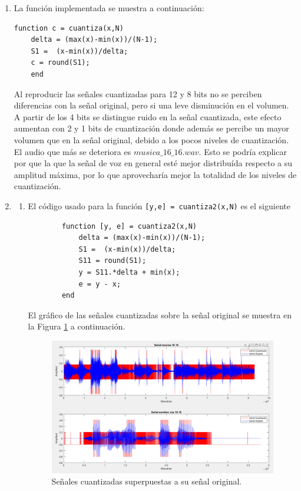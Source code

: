 \documentclass[letterpaper,onecolumn,10pt,journal,final]{IEEEtran}
\begin{document}
\begin{enumerate}[{1)}]
    \item La función implementada se muestra a continuación:
    
    \begin{lstlisting}[frame=single]
    function c = cuantiza(x,N)
    delta = (max(x)-min(x))/(N-1);
    S1 =  (x-min(x))/delta;
    c = round(S1);
    end
    \end{lstlisting}
    
    Al reproducir las señales cuantizadas para 12 y 8 bits no se perciben diferencias con la señal original, pero si una leve disminución en el volumen. A partir de los 4 bits se distingue ruido en la señal cuantizada, este efecto aumentan con 2 y 1 bits de cuantización donde además se percibe un mayor volumen que en la señal original, debido a los pocos niveles de cuantización.\\

    El audio que más se deteriora es $musica\_16\_16.wav$. Esto se podría explicar por que la que la señal de voz en general esté mejor distribuída respecto a su amplitud máxima, por lo que aprovecharía mejor la totalidad de los niveles de cuantización.

    
    
    \item
    \begin{enumerate}[{a)}]
        \item 
        
        El código usado para la función \texttt{[y,e] = cuantiza2(x,N)} es el siguiente
        \begin{lstlisting}
        function [y, e] = cuantiza2(x,N)
            delta = (max(x)-min(x))/(N-1);
            S1 =  (x-min(x))/delta;
            S11 = round(S1);
            y = S11.*delta + min(x);
            e = y - x;
        end 
        \end{lstlisting}
        
        El gráfico de las señales cuantizadas sobre la señal original se muestra en la Figura \ref{V2a} a continuación.
        
        \begin{figure}[H]
        \centering
        \includegraphics[scale=0.4]{Figuras/plotV2a.png}
        \caption{Señales cuantizadas superpuestas a su señal original.}\label{V2a}
        \end{figure}
        

\end{enumerate}
\end{enumerate}
\end{document}
